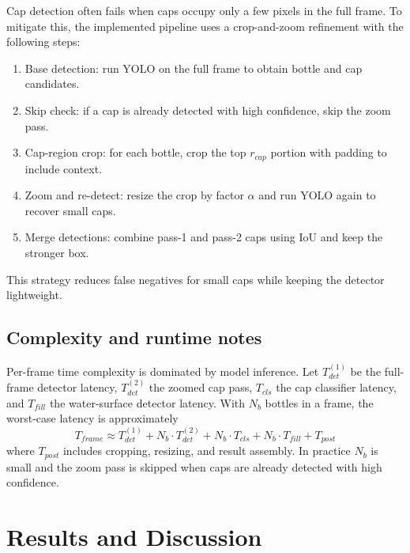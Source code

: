 \documentclass[12pt,a4paper]{report}
\begin{document}
Cap detection often fails when caps occupy only a few pixels in the full frame. To mitigate this, the implemented pipeline uses a crop-and-zoom refinement with the following steps:

\begin{enumerate}
  \item Base detection: run YOLO on the full frame to obtain bottle and cap candidates.
  \item Skip check: if a cap is already detected with high confidence, skip the zoom pass.
  \item Cap-region crop: for each bottle, crop the top $r_{cap}$ portion with padding to include context.
  \item Zoom and re-detect: resize the crop by factor $\alpha$ and run YOLO again to recover small caps.
  \item Merge detections: combine pass-1 and pass-2 caps using IoU and keep the stronger box.
\end{enumerate}

This strategy reduces false negatives for small caps while keeping the detector lightweight.

\section{Complexity and runtime notes}
\label{subsec:complexity}

Per-frame time complexity is dominated by model inference. Let $T_{det}^{(1)}$ be the full-frame detector latency, $T_{det}^{(2)}$ the zoomed cap pass, $T_{cls}$ the cap classifier latency, and $T_{fill}$ the water-surface detector latency. With $N_b$ bottles in a frame, the worst-case latency is approximately
\begin{equation}
T_{frame} \approx T_{det}^{(1)} + N_b\cdot T_{det}^{(2)} + N_b\cdot T_{cls} + N_b\cdot T_{fill} + T_{post}
\end{equation}
where $T_{post}$ includes cropping, resizing, and result assembly. In practice $N_b$ is small and the zoom pass is skipped when caps are already detected with high confidence.

\chapter{Results and Discussion}
\label{ch:results-discussion}
\end{document}

